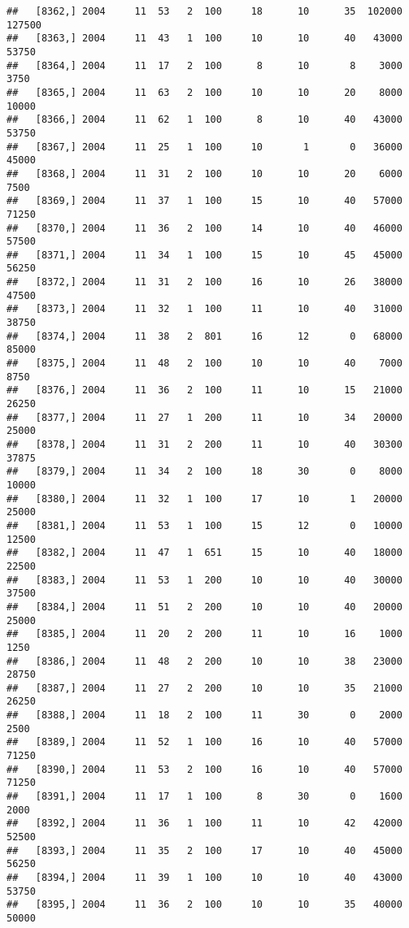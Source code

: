 \documentclass{article}\usepackage[]{graphicx}\usepackage[]{color}
\makeatletter
\newenvironment{kframe}{%
 \def\at@end@of@kframe{}%
 \ifinner\ifhmode%
  \def\at@end@of@kframe{\end{minipage}}%
  \begin{minipage}{\columnwidth}%
 \fi\fi%
 \def\FrameCommand##1{\hskip\@totalleftmargin \hskip-\fboxsep
 \colorbox{shadecolor}{##1}\hskip-\fboxsep
     \hskip-\linewidth \hskip-\@totalleftmargin \hskip\columnwidth}%
 \MakeFramed {\advance\hsize-\width
   \@totalleftmargin\z@ \linewidth\hsize
   \@setminipage}}%
 {\par\unskip\endMakeFramed%
 \at@end@of@kframe}
\newenvironment{knitrout}{}{} %
\makeatother
\begin{document}
\begin{knitrout}
\begin{kframe}
\begin{verbatim}
##   [8362,] 2004     11  53   2  100     18      10      35  102000  127500
##   [8363,] 2004     11  43   1  100     10      10      40   43000   53750
##   [8364,] 2004     11  17   2  100      8      10       8    3000    3750
##   [8365,] 2004     11  63   2  100     10      10      20    8000   10000
##   [8366,] 2004     11  62   1  100      8      10      40   43000   53750
##   [8367,] 2004     11  25   1  100     10       1       0   36000   45000
##   [8368,] 2004     11  31   2  100     10      10      20    6000    7500
##   [8369,] 2004     11  37   1  100     15      10      40   57000   71250
##   [8370,] 2004     11  36   2  100     14      10      40   46000   57500
##   [8371,] 2004     11  34   1  100     15      10      45   45000   56250
##   [8372,] 2004     11  31   2  100     16      10      26   38000   47500
##   [8373,] 2004     11  32   1  100     11      10      40   31000   38750
##   [8374,] 2004     11  38   2  801     16      12       0   68000   85000
##   [8375,] 2004     11  48   2  100     10      10      40    7000    8750
##   [8376,] 2004     11  36   2  100     11      10      15   21000   26250
##   [8377,] 2004     11  27   1  200     11      10      34   20000   25000
##   [8378,] 2004     11  31   2  200     11      10      40   30300   37875
##   [8379,] 2004     11  34   2  100     18      30       0    8000   10000
##   [8380,] 2004     11  32   1  100     17      10       1   20000   25000
##   [8381,] 2004     11  53   1  100     15      12       0   10000   12500
##   [8382,] 2004     11  47   1  651     15      10      40   18000   22500
##   [8383,] 2004     11  53   1  200     10      10      40   30000   37500
##   [8384,] 2004     11  51   2  200     10      10      40   20000   25000
##   [8385,] 2004     11  20   2  200     11      10      16    1000    1250
##   [8386,] 2004     11  48   2  200     10      10      38   23000   28750
##   [8387,] 2004     11  27   2  200     10      10      35   21000   26250
##   [8388,] 2004     11  18   2  100     11      30       0    2000    2500
##   [8389,] 2004     11  52   1  100     16      10      40   57000   71250
##   [8390,] 2004     11  53   2  100     16      10      40   57000   71250
##   [8391,] 2004     11  17   1  100      8      30       0    1600    2000
##   [8392,] 2004     11  36   1  100     11      10      42   42000   52500
##   [8393,] 2004     11  35   2  100     17      10      40   45000   56250
##   [8394,] 2004     11  39   1  100     10      10      40   43000   53750
##   [8395,] 2004     11  36   2  100     10      10      35   40000   50000

\end{verbatim}
\end{kframe}
\end{knitrout}
\end{document}

